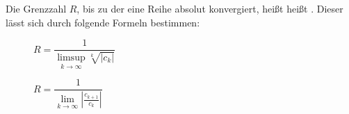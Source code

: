 Die Grenzzahl $R$, bis zu der eine Reihe absolut konvergiert, heißt heißt . Dieser lässt sich durch folgende Formeln bestimmen:
\begin{description}
    \item[] \qquad $R = \dfrac{1}{\limsup\limits_{k \to \infty} \sqrt[k]{|c_k|}}$
    \item[] \qquad $R = \dfrac{1}{\lim\limits_{k \to \infty} \left| \frac{c_{k+1}}{c_k} \right|}$
\end{description}